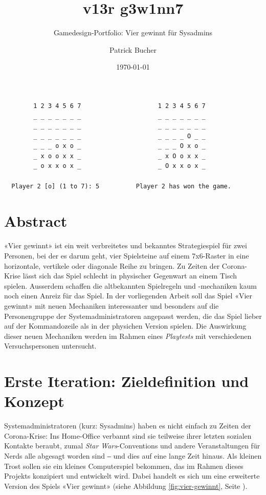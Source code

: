 \documentclass[a4paper,11pt,hidelinks]{scrartcl}
\newcommand{\imgref}[1]{{Abbildung \ref{#1}, Seite \pageref{#1}}}
\begin{document}
\author{Patrick Bucher}
\title{v13r g3w1nn7}
\subtitle{Gamedesign-Portfolio: Vier gewinnt für Sysadmins}
\date{\today}
\maketitle
\thispagestyle{empty}

\begin{center}
    \begin{lstlisting}
        1 2 3 4 5 6 7                     1 2 3 4 5 6 7
        _ _ _ _ _ _ _                     _ _ _ _ _ _ _
        _ _ _ _ _ _ _                     _ _ _ _ _ _ _
        _ _ _ _ _ _ _                     _ _ _ _ O _ _
        _ _ _ o x o _                     _ _ _ O x o _
        _ x o o x x _                     _ x O o x x _
        _ o x x o x _                     _ O x x o x _

  Player 2 [o] (1 to 7): 5          Player 2 has won the game.
    \end{lstlisting}
\end{center}

\section*{Abstract}

«Vier gewinnt» ist ein weit verbreitetes und bekanntes Strategiespiel für zwei Personen, bei der es darum geht, vier Spielsteine auf einem 7x6-Raster in eine horizontale, vertikele oder diagonale Reihe zu bringen. Zu Zeiten der Corona-Krise lässt sich das Spiel schlecht in physischer Gegenwart an einem Tisch spielen. Ausserdem schaffen die altbekannten Spielregeln und -mechaniken kaum noch einen Anreiz für das Spiel. In der vorliegenden Arbeit soll das Spiel «Vier gewinnt» mit neuen Mechaniken interessanter und besonders auf die Personengruppe der Systemadministratoren angepasst werden, die das Spiel lieber auf der Kommandozeile als in der physichen Version spielen. Die Auswirkung dieser neuen Mechaniken werden im Rahmen eines \textit{Playtests} mit verschiedenen Versuchspersonen untersucht.
 
\newpage

\tableofcontents
\newpage

\section{Erste Iteration: Zieldefinition und Konzept}

Systemadministratoren (kurz: Sysadmins) haben es nicht einfach zu Zeiten der Corona-Krise: Ins Home-Office verbannt sind sie teilweise ihrer letzten sozialen Kontakte beraubt, zumal \textit{Star Wars}-Conventions und andere Veranstaltungen für Nerds alle abgesagt worden sind ‒ und dies auf eine lange Zeit hinaus. Als kleinen Trost sollen sie ein kleines Computerspiel bekommen, das im Rahmen dieses Projekts konzipiert und entwickelt wird. Dabei handelt es sich um eine erweiterte Version des Spiels «Vier gewinnt» (siehe \imgref{fig:vier-gewinnt}).
\end{document}

